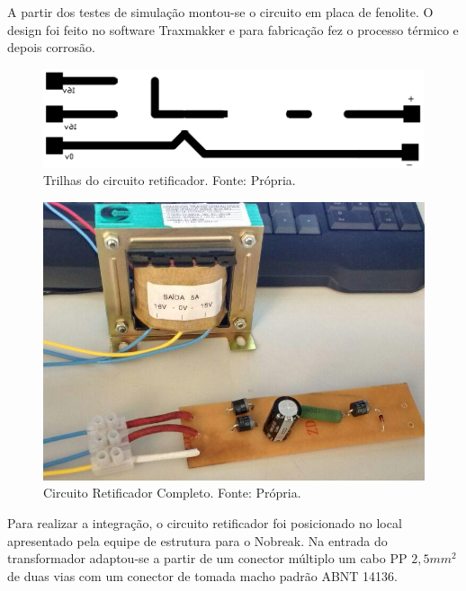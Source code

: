             	A partir dos testes de simulação montou-se o circuito em placa de fenolite. O 					design foi feito no software Traxmakker e para fabricação fez o processo 						térmico e depois corrosão.	
            	
                \begin{figure}[!htb]
            		\centering
            		\includegraphics[scale= 0.4]{figuras/Fenolite_Retificador.png}
            		\caption{Trilhas do circuito retificador. Fonte: Própria.}
            		\label{retificador-fenolite}
            	\end{figure}	
            	
                \begin{figure}[!htb]
            		\centering
            		\includegraphics[scale= 0.4]{figuras/Circuito_Retificador_Completo.png}
            		\caption{Circuito Retificador Completo. Fonte: Própria.}
            		\label{retificador-completo2}
            	\end{figure}	
            	
				Para realizar a integração, o circuito retificador foi posicionado no 							local apresentado pela equipe de estrutura para o Nobreak. Na entrada do 						transformador adaptou-se a partir de um conector múltiplo um cabo PP $2,5mm^2$ 				de duas vias com um conector de tomada macho padrão ABNT 14136.             	

